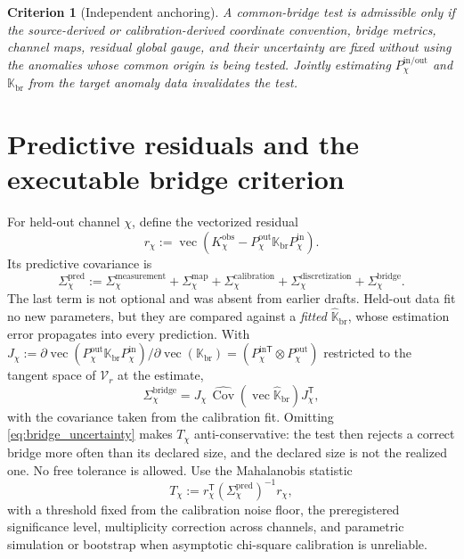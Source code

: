 \documentclass[11pt]{article}
\newtheorem{criterion}{Criterion}
\begin{document}
\begin{criterion}[Independent anchoring]
A common-bridge test is admissible only if the source-derived or calibration-derived coordinate convention, bridge metrics, channel maps, residual global gauge, and their uncertainty are fixed without using the anomalies whose common origin is being tested. Jointly estimating \(P_{\chi}^{\mathrm{in/out}}\) and \(\mathbb K_{\mathrm{br}}\) from the target anomaly data invalidates the test.
\label{crit:independent_anchoring}
\end{criterion}

\section{Predictive residuals and the executable bridge criterion}
\label{sec:predictive_test}

For held-out channel \(\chi\), define the vectorized residual
\begin{equation}
r_{\chi}
:=\operatorname{vec}
\left(
K_{\chi}^{\mathrm{obs}}
-P_{\chi}^{\mathrm{out}}
 \mathbb K_{\mathrm{br}}
 P_{\chi}^{\mathrm{in}}
\right).
\label{eq:vector_residual}
\end{equation}
Its predictive covariance is
\begin{equation}
\Sigma_{\chi}^{\mathrm{pred}}
:=
\Sigma_{\chi}^{\mathrm{measurement}}
+\Sigma_{\chi}^{\mathrm{map}}
+\Sigma_{\chi}^{\mathrm{calibration}}
+\Sigma_{\chi}^{\mathrm{discretization}}
+\Sigma_{\chi}^{\mathrm{bridge}}.
\label{eq:predictive_covariance}
\end{equation}
The last term is not optional and was absent from earlier drafts. Held-out data fit no new parameters, but they are compared against a \emph{fitted} \(\widehat{\mathbb K}_{\mathrm{br}}\), whose estimation error propagates into every prediction. With \(J_{\chi}:=\partial\operatorname{vec}(P_{\chi}^{\mathrm{out}}\mathbb K_{\mathrm{br}}P_{\chi}^{\mathrm{in}})/\partial\operatorname{vec}(\mathbb K_{\mathrm{br}})=(P_{\chi}^{\mathrm{in}\mathsf T}\otimes P_{\chi}^{\mathrm{out}})\) restricted to the tangent space of \(\mathcal V_{r}\) at the estimate,
\begin{equation}
\Sigma_{\chi}^{\mathrm{bridge}}
=J_{\chi}\,
\widehat{\operatorname{Cov}}\!\left(\operatorname{vec}\widehat{\mathbb K}_{\mathrm{br}}\right)
J_{\chi}^{\mathsf T},
\label{eq:bridge_uncertainty}
\end{equation}
with the covariance taken from the calibration fit. Omitting \cref{eq:bridge_uncertainty} makes \(T_{\chi}\) anti-conservative: the test then rejects a correct bridge more often than its declared size, and the declared size is not the realized one. No free tolerance is allowed. Use the Mahalanobis statistic
\begin{equation}
T_{\chi}
:=r_{\chi}^{\mathsf T}
\left(\Sigma_{\chi}^{\mathrm{pred}}\right)^{-1}
r_{\chi},
\label{eq:mahalanobis_channel}
\end{equation}
with a threshold fixed from the calibration noise floor, the preregistered significance level, multiplicity correction across channels, and parametric simulation or bootstrap when asymptotic chi-square calibration is unreliable.
\end{document}
